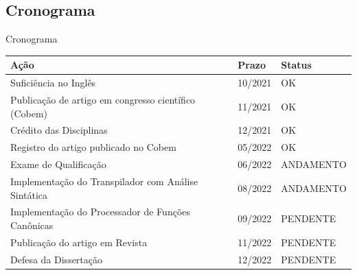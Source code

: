 \documentclass[aspectratio=169]{beamer}
\begin{document}
{\subsection{Cronograma}
\begin{frame}{Cronograma}
  \begin{scriptsize}
  \begin{tabular}{p{6.7cm}|p{1.0cm}|p{1.8cm}}
      \hline
      \bfseries{A\c c\~ao} & \bfseries{Prazo} & \bfseries{Status} \\
      \hline
      Sufici\^encia no Ingl\^es & 10/2021 & OK \\    
      \hline
      Publica\c c\~ao de artigo em congresso cient\'ifico (Cobem) & 11/2021 & OK \\
      \hline
      Cr\'edito das Disciplinas & 12/2021 & OK \\ 
      \hline
      Registro do artigo publicado no Cobem & 05/2022 & OK \\
      \hline
      Exame de Qualifica\c c\~ao & 06/2022 & ANDAMENTO \\ 
      \hline    
      Implementa\c c\~ao do Transpilador com An\'alise Sint\'atica & 08/2022 & ANDAMENTO \\
      \hline
      Implementa\c c\~ao do Processador de Fun\c c\~oes Can\^onicas & 09/2022 & PENDENTE \\
      \hline
      Publica\c c\~ao do artigo em Revista & 11/2022 & PENDENTE \\    
      \hline
      Defesa da Disserta\c c\~ao & 12/2022 & PENDENTE \\    
      \hline        
  \end{tabular}
  \end{scriptsize}
\end{frame}






}
\end{document}
